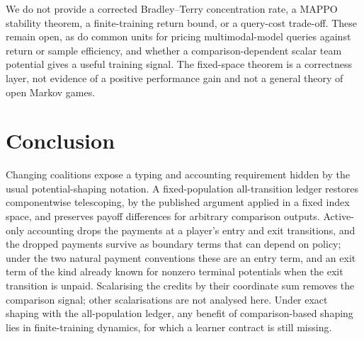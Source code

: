 \documentclass{article}
\begin{document}
We do not provide a corrected Bradley--Terry concentration rate, a MAPPO stability theorem, a finite-training return bound, or a query-cost trade-off. These remain open, as do common units for pricing multimodal-model queries against return or sample efficiency, and whether a comparison-dependent scalar team potential gives a useful training signal. The fixed-space theorem is a correctness layer, not evidence of a positive performance gain and not a general theory of open Markov games.

\section{Conclusion}

Changing coalitions expose a typing and accounting requirement hidden by the usual potential-shaping notation. A fixed-population all-transition ledger restores componentwise telescoping, by the published argument applied in a fixed index space, and preserves payoff differences for arbitrary comparison outputs. Active-only accounting drops the payments at a player's entry and exit transitions, and the dropped payments survive as boundary terms that can depend on policy; under the two natural payment conventions these are an entry term, and an exit term of the kind already known for nonzero terminal potentials when the exit transition is unpaid. Scalarising the credits by their coordinate sum removes the comparison signal; other scalarisations are not analysed here. Under exact shaping with the all-population ledger, any benefit of comparison-based shaping lies in finite-training dynamics, for which a learner contract is still missing.



\end{document}
